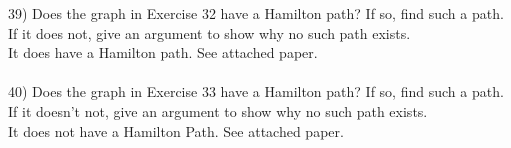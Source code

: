 \documentclass{article}
\begin{document}
\begin{flushleft}
\setlength\parindent{0pt}39) Does the graph in Exercise 32 have a Hamilton path?  If so, find such a path.  If it does not, give an argument to show why no such path exists. \\
\setlength\parindent{24pt}It does have a Hamilton path.  See attached paper. \\
~\\
\setlength\parindent{0pt}40) Does the graph in Exercise 33 have a Hamilton path?  If so, find such a path.  If it doesn't not, give an argument to show why no such path exists. \\
\setlength\parindent{24pt}It does not have a Hamilton Path.  See attached paper. \\


\end{flushleft}
\end{document}
